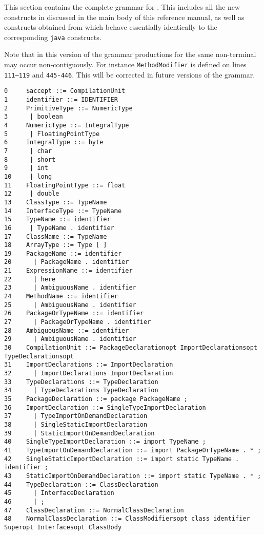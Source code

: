 \onecolumn
{}\label{X10 syntax}

This section contains the complete grammar for \Xten{}. This includes
all the new constructs in \Xten{} discussed in the main body of this
reference manual, as well as constructs obtained from \java{} which
behave essentially identically to the corresponding {\tt java} constructs.

Note that in this version of the grammar productions for the same
non-terminal may occur non-contiguously. For instance 
{\tt MethodModifier} is defined on lines {\tt 111--119} and
{\tt 445-446}. This will be corrected in future versions of the grammar.


\begin{verbatim}
0     $accept ::= CompilationUnit
1     identifier ::= IDENTIFIER
2     PrimitiveType ::= NumericType
3      | boolean
4     NumericType ::= IntegralType
5      | FloatingPointType
6     IntegralType ::= byte
7      | char
8      | short
9      | int
10     | long
11    FloatingPointType ::= float
12     | double
13    ClassType ::= TypeName
14    InterfaceType ::= TypeName
15    TypeName ::= identifier
16     | TypeName . identifier
17    ClassName ::= TypeName
18    ArrayType ::= Type [ ]
19    PackageName ::= identifier
20      | PackageName . identifier
21    ExpressionName ::= identifier
22      | here
23      | AmbiguousName . identifier
24    MethodName ::= identifier
25      | AmbiguousName . identifier
26    PackageOrTypeName ::= identifier
27      | PackageOrTypeName . identifier
28    AmbiguousName ::= identifier
29      | AmbiguousName . identifier
30    CompilationUnit ::= PackageDeclarationopt ImportDeclarationsopt TypeDeclarationsopt
31    ImportDeclarations ::= ImportDeclaration
32      | ImportDeclarations ImportDeclaration
33    TypeDeclarations ::= TypeDeclaration
34      | TypeDeclarations TypeDeclaration
35    PackageDeclaration ::= package PackageName ;
36    ImportDeclaration ::= SingleTypeImportDeclaration
37      | TypeImportOnDemandDeclaration
38      | SingleStaticImportDeclaration
39      | StaticImportOnDemandDeclaration
40    SingleTypeImportDeclaration ::= import TypeName ;
41    TypeImportOnDemandDeclaration ::= import PackageOrTypeName . * ;
42    SingleStaticImportDeclaration ::= import static TypeName . identifier ;
43    StaticImportOnDemandDeclaration ::= import static TypeName . * ;
44    TypeDeclaration ::= ClassDeclaration
45      | InterfaceDeclaration
46      | ;
47    ClassDeclaration ::= NormalClassDeclaration
48    NormalClassDeclaration ::= ClassModifiersopt class identifier Superopt Interfacesopt ClassBody

\end{verbatim}
